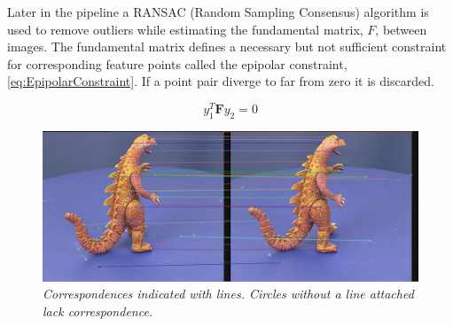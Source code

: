 Later in the pipeline a RANSAC (Random Sampling Consensus) algorithm is used to remove outliers while estimating the fundamental matrix, $F$, between images. The fundamental matrix defines a necessary but not sufficient constraint for corresponding feature points called the epipolar constraint, \ref{eq:EpipolarConstraint}. If a point pair diverge to far from zero it is discarded.

\begin{equation}
\label{eq:EpipolarConstraint}
y_1^T \boldsymbol{F} y_2 = 0
\end{equation} 

\begin{figure}[htb]
	\centering
	\includegraphics[width=\textwidth] {images/CorrespondenceDetection.png}
	\caption{\textit{Correspondences indicated with lines. Circles without a line attached lack correspondence.}}
	\label{fig:Correspondences} %
\end{figure}